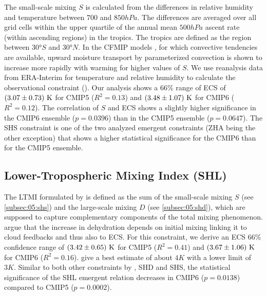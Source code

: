 The small-scale mixing $S$ \autocite{Sherwood2014} is calculated from the
differences in relative humidity and temperature between $700$ and $850
\unit{hPa}$. The differences are averaged over all grid cells within the upper
quartile of the annual mean $500 \unit{hPa}$ ascent rate (within ascending
regions) in the tropics. The tropics are defined as the region between $30
\unit{\degree S}$ and $30 \unit{\degree N}$. In the \ac{CFMIP} models
\autocite{Webb2017}, for which convective tendencies are available, upward
moisture transport by parameterized convection is shown to increase more
rapidly with warming for higher values of $S$. We use reanalysis data from
ERA-Interim \autocite{Dee2011} for temperature and relative humidity to
calculate the observational constraint (). Our analysis shows
a $66 \unit{\%}$ range of \ac{ECS} of $\pmrangeunit{3.07}{0.73}{K}$ for
\acs{CMIP}5 ($R^2 = 0.13$) and $\pmrangeunit{3.48}{1.07}{K}$ for \acs{CMIP}6
($R^2 = 0.12$). The correlation of $S$ and \acs{ECS} shows a slightly higher
significance in the \acs{CMIP}6 ensemble ($p = 0.0396$) than in the \acs{CMIP}5
ensemble ($p = 0.0647$). The SHS constraint is one of the two analyzed emergent
constraints (ZHA being the other exception) that shows a higher statistical
significance for the \acs{CMIP}6 than for the \acs{CMIP}5 ensemble.


\subsection{Lower-Tropospheric Mixing Index (SHL)}
\label{subsec:05:shl}

The \ac{LTMI} formulated by \textcite{Sherwood2014} is defined as the sum of
the small-scale mixing $S$ (see \cref{subsec:05:shs}) and the large-scale
mixing $D$ (see \cref{subsec:05:shd}), which are supposed to capture
complementary components of the total mixing phenomenon.
\textcite{Sherwood2014} argue that the increase in dehydration depends on
initial mixing linking it to cloud feedbacks and thus also to \ac{ECS}. For
this constraint, we derive an \ac{ECS} $66 \unit{\%}$ confidence range of
$\pmrangeunit{3.42}{0.65}{K}$ for \acs{CMIP}5 ($R^2 = 0.41$) and
$\pmrangeunit{3.67}{1.06}{K}$ for \acs{CMIP}6 ($R^2 = 0.16$).
\textcite{Sherwood2014} give a best estimate of about $4 \unit{K}$ with a lower
limit of $3 \unit{K}$. Similar to both other constraints by
\textcite{Sherwood2014}, SHD and SHS, the statistical significance of the SHL
emergent relation decreases in \acs{CMIP}6 ($p = 0.0138$) compared to
\acs{CMIP}5 ($p = 0.0002$).


